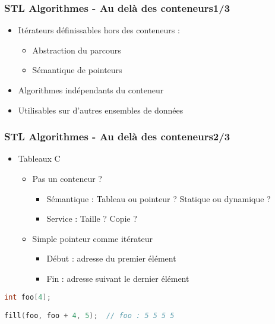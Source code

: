 \documentclass[C++.tex]{subfiles}
\begin{document}
\begin{frame}
	\frametitle{STL Algorithmes - Au delà des conteneurs\titlehfill{}1/3}
	\begin{itemize}
		\item Itérateurs définissables hors des conteneurs :
		\begin{itemize}
			\item Abstraction du parcours
			\item Sémantique de pointeurs
		\end{itemize}
		\item Algorithmes indépendants du conteneur
		\item Utilisables sur d'autres ensembles de données
	\end{itemize}
\end{frame}

\begin{frame}[fragile]
	\frametitle{STL Algorithmes - Au delà des conteneurs\titlehfill{}2/3}
	\begin{itemize}
		\item Tableaux C
		\begin{itemize}
			\item Pas un conteneur ?


			\begin{itemize}
				\item Sémantique : Tableau ou pointeur ? Statique ou dynamique ?
				\item Service : Taille ? Copie ?
			\end{itemize}
			\item Simple pointeur comme itérateur
			\begin{itemize}
				\item Début : adresse du premier élément
				\item Fin : adresse suivant le dernier élément
			\end{itemize}
		\end{itemize}
	\end{itemize}

	\begin{lstlisting}[language=C++]
int foo[4];

fill(foo, foo + 4, 5);  // foo : 5 5 5 5\end{lstlisting}
\end{frame}
\end{document}
